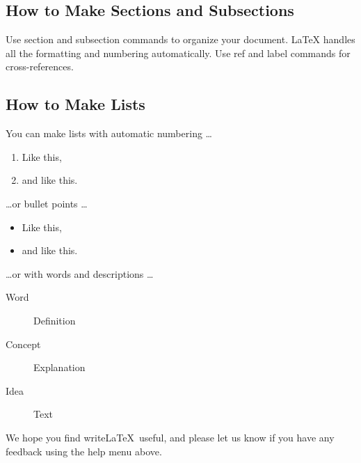 \documentclass[a4paper]{report}
\begin{document}
    \subsection{How to Make Sections and Subsections}
    
    Use section and subsection commands to organize your document. \LaTeX{} handles all the formatting and numbering automatically. Use ref and label commands for cross-references.
    
    \subsection{How to Make Lists}
    
    You can make lists with automatic numbering \dots
    
    \begin{enumerate}
    \item Like this,
    \item and like this.
    \end{enumerate}
    \dots or bullet points \dots
    \begin{itemize}
    \item Like this,
    \item and like this.
    \end{itemize}
    \dots or with words and descriptions \dots
    \begin{description}
    \item[Word] Definition
    \item[Concept] Explanation
    \item[Idea] Text
    \end{description}
    
    We hope you find write\LaTeX\ useful, and please let us know if you have any feedback using the help menu above.

    
\end{document}
